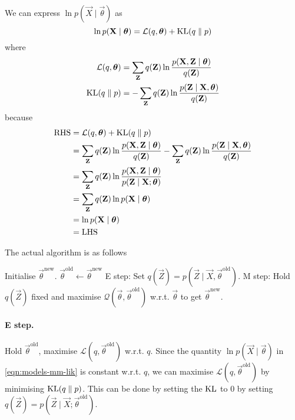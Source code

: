 We can express $\ln p(\vec X \mid \vec \theta)$ as
\begin{equation}
    \ln p(\boldsymbol{\mathbf{X}} \mid \boldsymbol{\mathbf{\theta}}) = \mathcal L(q, \boldsymbol{\mathbf{\theta}}) + \operatorname{KL}(q \parallel p) \label{eqn:models-mm-lik}
\end{equation}
where
\begin{align}
    \mathcal L(q, \boldsymbol{\mathbf{\theta}})  &= \sum_{\boldsymbol{\mathbf{Z}}} q(\boldsymbol{\mathbf{Z}}) \ln \frac{p(\boldsymbol{\mathbf{X}}, \boldsymbol{\mathbf{Z}} \mid \boldsymbol{\mathbf{\theta}})}{q(\boldsymbol{\mathbf{Z}})} \\
    \operatorname{KL}(q \parallel p)          &= -\sum_{\boldsymbol{\mathbf{Z}}} q(\boldsymbol{\mathbf{Z}}) \ln \frac{p(\boldsymbol{\mathbf{Z}} \mid \boldsymbol{\mathbf{X}}, \boldsymbol{\mathbf{\theta}})}{q(\boldsymbol{\mathbf{Z}})}
\end{align}
because
\begin{align*}
    \text{RHS}  &= \mathcal L(q, \boldsymbol{\mathbf{\theta}}) + \operatorname{KL}(q \parallel p)\\
                &= \sum_{\boldsymbol{\mathbf{Z}}} q(\boldsymbol{\mathbf{Z}}) \ln \frac{p(\boldsymbol{\mathbf{X}}, \boldsymbol{\mathbf{Z}} \mid \boldsymbol{\mathbf{\theta}})}{q(\boldsymbol{\mathbf{Z}})} - \sum_{\boldsymbol{\mathbf{Z}}} q(\boldsymbol{\mathbf{Z}}) \ln \frac{p(\boldsymbol{\mathbf{Z}} \mid \boldsymbol{\mathbf{X}}, \boldsymbol{\mathbf{\theta}})}{q(\boldsymbol{\mathbf{Z}})} \\
                &= \sum_{\boldsymbol{\mathbf{Z}}} q(\boldsymbol{\mathbf{Z}}) \ln \frac{p(\boldsymbol{\mathbf{X}}, \boldsymbol{\mathbf{Z}} \mid \boldsymbol{\mathbf{\theta}})}{p(\boldsymbol{\mathbf{Z}} \mid \boldsymbol{\mathbf{X}}; \boldsymbol{\mathbf{\theta}})} \\
                &= \sum_{\boldsymbol{\mathbf{Z}}} q(\boldsymbol{\mathbf{Z}}) \ln p(\boldsymbol{\mathbf{X}} \mid \boldsymbol{\mathbf{\theta}}) \\
                &= \ln p(\boldsymbol{\mathbf{X}} \mid \boldsymbol{\mathbf{\theta}}) \\
                &= \text{LHS}
\end{align*}

The actual algorithm is as follows
\begin{algorithmbis}\label{alg:em}
    \begin{algorithmic}[1]
        \State Initialise $\vec \theta^{\text{new}}$.
        \Repeat
            \State $\vec \theta^{\text{old}} \gets \vec \theta^{\text{new}}$
            \State E step: Set $q(\vec Z) = p\left(\vec Z \mid \vec X, \vec \theta^{\text{old}}\right)$.
            \State M step: Hold $q(\vec Z)$ fixed and maximise $\mathcal Q\left(\vec \theta, \vec \theta^{\text{old}}\right)$ w.r.t. $\vec \theta$ to get $\vec \theta^{\text{new}}$.
    \end{algorithmic}
\end{algorithmbis}

\paragraph{E step.} Hold $\vec \theta^{\text{old}}$, maximise $\mathcal L\left(q, \vec \theta^{\text{old}}\right)$ w.r.t. $q$. Since the quantity $\ln p(\vec X \mid \vec \theta)$ in \eqref{eqn:models-mm-lik} is constant w.r.t. $q$, we can maximise $\mathcal L\left(q, \vec \theta^{\text{old}}\right)$ by minimising $\operatorname{KL}(q \parallel p)$. This can be done by setting the $\operatorname{KL}$ to $0$ by setting $q(\vec Z) = p(\vec Z \mid \vec X; \vec \theta^{\text{old}})$.

